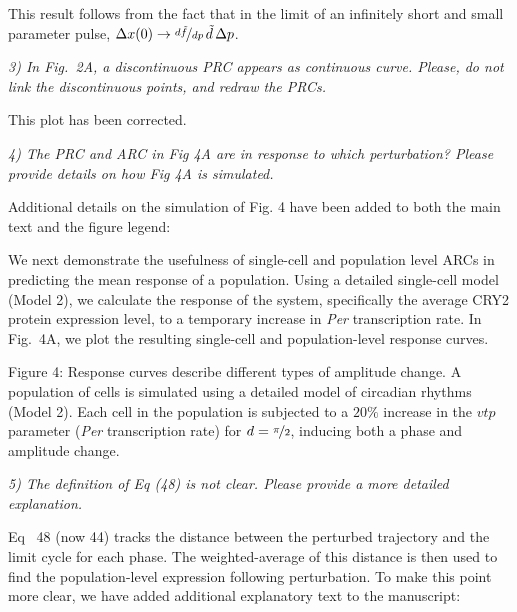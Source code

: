 \documentclass[11pt, letterpaper]{article}
\newenvironment{reviewer}{\itshape\color{gray}}{}
\newenvironment{manuscript}[1]{\begin{center}\begin{tcolorbox}[colback=green!5!white,colframe=green!75!black,width=0.8\textwidth,title={#1},breakable,fonttitle=\bfseries]}{\end{tcolorbox}\end{center}}
\begin{document}
\begin{manuscript}{Page 5}
This result follows from the fact that in the limit of an infinitely short and small parameter pulse, $\Delta x(0) \to \nicefrac{d\tilde{f}}{dp}\,\tilde{d}\, \Delta p$.
\end{manuscript}

\begin{reviewer}
3) In Fig.~2A, a discontinuous PRC appears as continuous curve.
Please, do not link the discontinuous points, and redraw the PRCs.
\end{reviewer}

This plot has been corrected.

\begin{reviewer}
4) The PRC and ARC in Fig 4A are in response to which perturbation?
Please provide details on how Fig 4A is simulated.
\end{reviewer}

Additional details on the simulation of Fig. 4 have been added to both the main text and the figure legend:

\begin{manuscript}{Page 14}
We next demonstrate the usefulness of single-cell and population level ARCs in predicting the mean response of a population.
Using a detailed single-cell model (Model 2), we calculate the response of the system, specifically the average CRY2 protein expression level, to a temporary increase in {\itshape Per} transcription rate.
In Fig.~4A, we plot the resulting single-cell and population-level response curves.
\end{manuscript}

\begin{manuscript}{Page 15}
Figure 4: Response curves describe different types of amplitude change.
A population of cells is simulated using a detailed model of circadian rhythms (Model 2).
Each cell in the population is subjected to a $20\%$ increase in the $\mathit{vtp}$ parameter ({\itshape Per} transcription rate) for $d=\nicefrac{\pi}{2}$, inducing both a phase and amplitude change.
\end{manuscript}

\begin{reviewer}
5) The definition of Eq (48) is not clear.
Please provide a more detailed explanation.
\end{reviewer}

Eq~ 48 (now 44) tracks the distance between the perturbed trajectory and the limit cycle for each phase.
The weighted-average of this distance is then used to find the population-level expression following perturbation.
To make this point more clear, we have added additional explanatory text to the manuscript:
\end{document}
